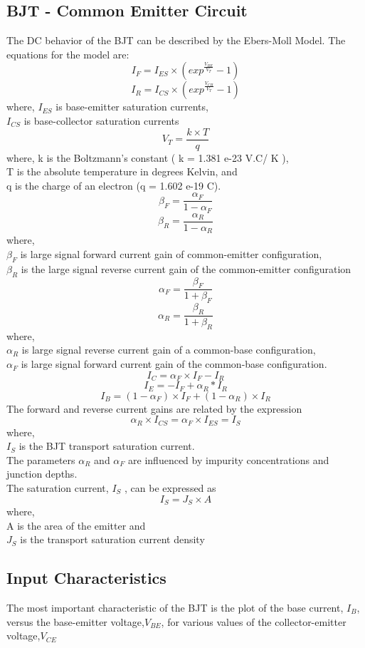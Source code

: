 		\subsection{BJT - Common Emitter Circuit}
			The DC behavior of the BJT can be described by the Ebers-Moll Model. The equations for the model are:
			$$I_F= I_{ES} \times ( exp^ \frac{V_{BE}}{V_T} -1)$$
			$$I_R= I_{CS} \times(exp^ \frac{V_{CB}}{V_T} -1)$$ where,
			\(I _{ES}\) is base-emitter saturation currents,\\
			\(I_{CS}\) is base-collector saturation currents
			$$V_T = \frac{k \times T}{q}$$
			where,
			k is the Boltzmann’s constant ( k = 1.381 e-23 V.C/ K ),\\
			T is the absolute temperature in degrees Kelvin, and\\
			q is the charge of an electron (q = 1.602 e-19 C).			
			$$\beta_F = \frac{\alpha_F}{1 - \alpha_F}$$ $$\beta_R= \frac{\alpha_R}{1 - \alpha_R}$$
			where,\\
			\(\beta_F\) is large signal forward current gain of common-emitter configuration,\\
			\(\beta_R\) is the large signal reverse current gain of the common-emitter configuration
			$$ \alpha_F=\frac{\beta_F}{1 + \beta_F}$$
			$$\alpha_R=\frac{\beta_R}{1 + \beta_R}$$
			where,\\
			\(\alpha_R\) is large signal reverse current gain of a common-base configuration,\\
			\(\alpha_F\) is large signal forward current gain of the common-base configuration.
			$$I_C = \alpha_F \times I_F - I_R$$
			$$ I_E = -I_F + \alpha_R * I_R$$
			$$ I_B = (1 - \alpha_F) \times I_F + (1 - \alpha_R) \times I_R$$
			The forward and reverse current gains are related by the expression
			$$ \alpha_R \times I_{CS}=\alpha_F \times I_{ ES} =I_S$$
			where,\\
			\(I_S\) is the BJT transport saturation current.\\
			The parameters \(\alpha_R\) and \(\alpha_F\) are influenced by impurity concentrations and junction depths.\\
			The saturation current, \(I_S\) , can be expressed as
			$$ I_S = J_S \times A$$
			where,\\
			A is the area of the emitter and\\
			\(J_S\) is the transport saturation current density
		
		\subsection{Input Characteristics}
			The most important characteristic of the BJT is the plot of the base current, \(I_B\), versus the base-emitter voltage,\(V_{BE}\), for various values of the collector-emitter voltage,\(V_{CE}\)		
			
